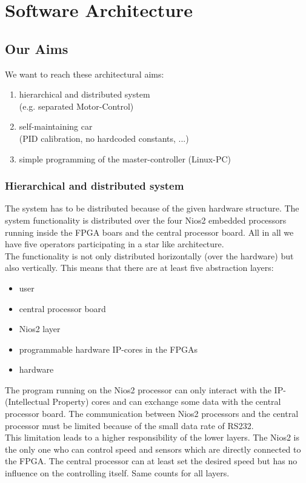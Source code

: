 \section{Software Architecture}

\subsection{Our Aims}

We want to reach these architectural aims:
\begin{enumerate}
	\item hierarchical and distributed system\\
	(e.g. separated Motor-Control)
	\item self-maintaining car \\
	(PID calibration, no hardcoded constants, ...)
	\item simple programming of the master-controller (Linux-PC)
\end{enumerate}

\subsubsection{Hierarchical and distributed system}

The system has to be distributed because of the given hardware structure. The system functionality is distributed over the four Nios2 embedded processors running inside the FPGA boars and the central processor board. All in all we have five operators participating in a star like architecture.\\

The functionality is not only distributed horizontally (over the hardware) but also vertically. This means that there are at least five abstraction layers:
\begin{itemize}
	\item user
	\item central processor board
	\item Nios2 layer
	\item programmable hardware IP-cores in the FPGAs
	\item hardware
\end{itemize}

The program running on the Nios2 processor can only interact with the IP-(Intellectual Property) cores and can exchange some data with the central processor board. The communication between Nios2 processors and the central processor must be limited because of the small data rate of RS232.\\
This limitation leads to a higher responsibility of the lower layers. The Nios2 is the only one who can control speed and sensors which are directly connected to the FPGA. The central processor can at least set the desired speed but has no influence on the controlling itself. Same counts for all layers.\\

